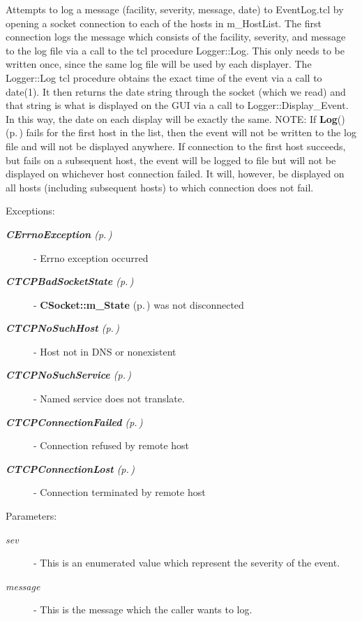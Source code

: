 Attempts to log a message (facility, severity, message, date) to  Event\-Log.tcl by opening a socket connection to each of the hosts in m\_\-Host\-List. The first connection logs the message which consists of the facility, severity, and message to the log file via a call to the tcl procedure Logger::Log. This only needs to be written once, since the same log file will be used by each displayer. The Logger::Log tcl procedure obtains the exact time of the event via a call to date(1). It then returns the date string through the socket (which we read) and that string is what is displayed on the GUI via a call to Logger::Display\_\-Event. In this way, the date on each display will be exactly the same. NOTE: If {\bf Log}() {\rm (p.\,\pageref{classCLogger_a3})} fails for the first host in the list, then the event will not be written to the log file and will not be displayed anywhere.  If connection to the first host succeeds, but fails on a subsequent host, the event will be logged to file but will not be displayed on whichever host connection failed. It will, however, be displayed on all hosts (including subsequent hosts) to which connection does not fail.\begin{Desc}
\item[Exceptions: ]\par
\begin{description}
\item[{\em 
{\bf CErrno\-Exception} {\rm (p.\,\pageref{classCErrnoException})}}] - Errno exception occurred \item[{\em 
{\bf CTCPBad\-Socket\-State} {\rm (p.\,\pageref{classCTCPBadSocketState})}}] - {\bf CSocket::m\_\-State} {\rm (p.\,\pageref{classCSocket_o1})} was not disconnected \item[{\em 
{\bf CTCPNo\-Such\-Host} {\rm (p.\,\pageref{classCTCPNoSuchHost})}}] - Host not in DNS or nonexistent \item[{\em 
{\bf CTCPNo\-Such\-Service} {\rm (p.\,\pageref{classCTCPNoSuchService})}}] - Named service does not translate. \item[{\em 
{\bf CTCPConnection\-Failed} {\rm (p.\,\pageref{classCTCPConnectionFailed})}}] - Connection refused by remote host \item[{\em 
{\bf CTCPConnection\-Lost} {\rm (p.\,\pageref{classCTCPConnectionLost})}}] - Connection terminated by remote host\end{description}
\end{Desc}
\begin{Desc}
\item[Parameters: ]\par
\begin{description}
\item[{\em 
sev}]- This is an enumerated value which represent the severity of the event. \item[{\em 
message}]- This is the message which the caller wants to log. \end{description}
\end{Desc}


